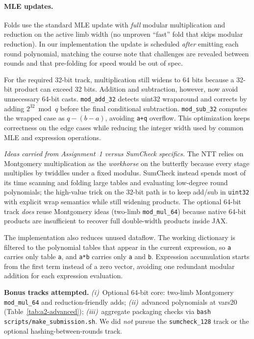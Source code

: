\documentclass[conference]{IEEEtran}
\begin{document}
\paragraph{MLE updates.}
Folds use the standard MLE update with \emph{full} modular multiplication
and reduction on the active limb width (no unproven ``fast'' fold that skips
modular reduction). In our implementation the update is scheduled
\emph{after} emitting each round polynomial, matching the course note that
challenges are revealed between rounds and that pre-folding for speed would be
out of spec.

For the required 32-bit track, multiplication still widens to 64 bits because a
32-bit product can exceed 32 bits. Addition and subtraction, however, now avoid
unnecessary 64-bit casts. \texttt{mod\_add\_32} detects uint32 wraparound and
corrects by adding $2^{32}\bmod q$ before the final conditional subtraction.
\texttt{mod\_sub\_32} computes the wrapped case as $q-(b-a)$, avoiding
\texttt{a+q} overflow. This optimization keeps correctness on the edge cases
while reducing the integer width used by common MLE and expression operations.

\textit{Ideas carried from Assignment~1 versus SumCheck specifics.}
The NTT relies on Montgomery multiplication as the \emph{workhorse} on the
butterfly because every stage multiplies by twiddles under a fixed modulus.
SumCheck instead spends most of its time scanning and folding large tables and
evaluating low-degree round polynomials; the high-value trick on the 32-bit
path is to keep add/sub in \texttt{uint32} with explicit wrap semantics while
still widening products. The optional 64-bit track \emph{does} reuse Montgomery
ideas (two-limb \texttt{mod\_mul\_64}) because native 64-bit products are
insufficient to recover full double-width products inside JAX.

The implementation also reduces unused dataflow. The working dictionary is
filtered to the polynomial tables that appear in the current expression, so
\texttt{a} carries only table \texttt{a}, and \texttt{a*b} carries only
\texttt{a} and \texttt{b}. Expression accumulation starts from the first term
instead of a zero vector, avoiding one redundant modular addition for each
expression evaluation.

\textbf{Bonus tracks attempted.}
\textit{(i)}~Optional 64-bit core: two-limb Montgomery \texttt{mod\_mul\_64}
and reduction-friendly adds; \textit{(ii)}~advanced polynomials at vars20
(Table~\ref{tab:a2-advanced}); \textit{(iii)}~aggregate packaging checks via
\texttt{bash scripts/make\_submission.sh}. We did \emph{not} pursue the
\texttt{sumcheck\_128} track or the optional hashing-between-rounds track.
\end{document}
